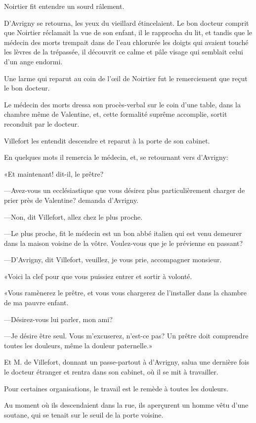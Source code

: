 Noirtier fit entendre un sourd râlement. 

D'Avrigny se retourna, les yeux du vieillard étincelaient. Le bon docteur comprit que Noirtier réclamait la vue de son enfant, il le rapprocha du lit, et tandis que le médecin des morts trempait dans de l'eau chlorurée les doigts qui avaient touché les lèvres de la trépassée, il découvrit ce calme et pâle visage qui semblait celui d'un ange endormi. 

Une larme qui reparut au coin de l'œil de Noirtier fut le remerciement que reçut le bon docteur. 

Le médecin des morts dressa son procès-verbal sur le coin d'une table, dans la chambre même de Valentine, et, cette formalité suprême accomplie, sortit reconduit par le docteur. 

Villefort les entendit descendre et reparut à la porte de son cabinet. 

En quelques mots il remercia le médecin, et, se retournant vers d'Avrigny: 

«Et maintenant! dit-il, le prêtre? 

—Avez-vous un ecclésiastique que vous désirez plus particulièrement charger de prier près de Valentine? demanda d'Avrigny. 

—Non, dit Villefort, allez chez le plus proche. 

—Le plus proche, fit le médecin est un bon abbé italien qui est venu demeurer dans la maison voisine de la vôtre. Voulez-vous que je le prévienne en passant? 

—D'Avrigny, dit Villefort, veuillez, je vous prie, accompagner monsieur. 

«Voici la clef pour que vous puissiez entrer et sortir à volonté. 

«Vous ramènerez le prêtre, et vous vous chargerez de l'installer dans la chambre de ma pauvre enfant. 

—Désirez-vous lui parler, mon ami? 

—Je désire être seul. Vous m'excuserez, n'est-ce pas? Un prêtre doit comprendre toutes les douleurs, même la douleur paternelle.» 

Et M. de Villefort, donnant un passe-partout à d'Avrigny, salua une dernière fois le docteur étranger et rentra dans son cabinet, où il se mit à travailler. 

Pour certaines organisations, le travail est le remède à toutes les douleurs. 

Au moment où ils descendaient dans la rue, ils aperçurent un homme vêtu d'une soutane, qui se tenait sur le seuil de la porte voisine. 

